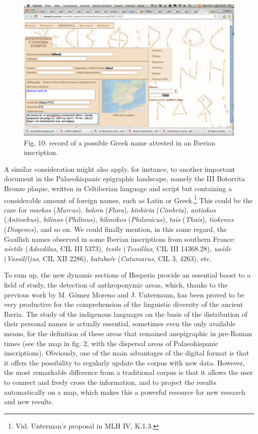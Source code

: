 \documentclass[amsthm,ebook]{saparticle}
\begin{document}
\begin{figure}[!bp]
\centering
 \includegraphics[width=\columnwidth]{EpigraphyandonomasticsinHesperiadatabanktemplate-img010.png}
\caption{Fig. 10: record of a possible Greek name attested in an Iberian inscription.}
\label{fig:10}
\end{figure}
 



A similar consideration might also apply, for instance, to another important document in the Palaeohispanic epigraphic
landscape, namely the III Botorrita Bronze plaque, written in Celtiberian language and script but containing a
considerable amount of foreign names, such as Latin or Greek.\footnote{ Vid. Unterman’s proposal in MLH IV, K.1.3. }
This could be the case for \emph{markos} (\emph{Marcus}), \emph{bolora} (\emph{Flora}), \emph{kinbiria} (\emph{Cimbria}), \emph{antiokos} (\emph{Antiochus}), \emph{bilinos}
(\emph{Philinus}), \emph{bilonikos} (\emph{Philonicus}), \emph{tais} (\emph{Thais}), \emph{tiokenes} (\emph{Diogenes}), and so on. We could finally mention, in this
same regard, the Gaullish names observed in some Iberian inscriptions from southern France: \emph{aśetile} (\emph{Adsedilus}, CIL III
5373), \emph{tesile} (\emph{Tessillus}, CIL III 14368.28), \emph{uaśile} (\emph{Vassil(l)us}, CIL XII 2286), \emph{katubaŕe} (\emph{Catumarus}, CIL 3, 4263),
etc.

To sum up, the new dynamic sections of Hesperia provide an essential boost to a field of study, the detection of
anthroponymic areas, which, thanks to the previous work by M. Gómez Moreno and J. Untermann, has been proved to be very
productive for the comprehension of the linguistic diversity of the ancient Iberia. The study of the indigenous
languages on the basis of the distribution of their personal names is actually essential, sometimes even the only
available means, for the definition of these areas that remained anepigraphic in pre-Roman times (see the map in fig.
2, with the dispersal areas of Palaeohispanic inscriptions). Obviously, one of the main advantages of the digital
format is that it offers the possibility to regularly update the corpus with new data. However, the most remarkable
difference from a traditional corpus is that it allows the user to connect and freely cross the information, and to
project the results automatically on a map, which makes this a powerful resource for new research and new results.
\end{document}
